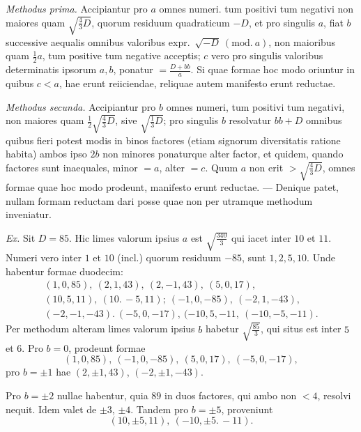 \emph{Methodus prima.} Accipiantur pro $a$ omnes numeri. tum positivi tum negativi non maiores quam $\surd{\frac43 D}$, quorum residuum quadraticum $-D$, et pro singulis $a$, fiat $b$ successive aequalis omnibus valoribus expr.\ $\surd{-D}\ (\mathrm{mod.}\ a)$, non maioribus quam $\frac12 a$, tum positive tum negative acceptis; $c$ vero pro singulis valoribus determinatis ipsorum $a,b$, ponatur $=\frac{D+bb}{a}$. Si quae formae hoc modo oriuntur in quibus $c<a$, hae erunt reiiciendae, reliquae autem manifesto erunt reductae.

\emph{Methodus secunda.} Accipiantur pro $b$ omnes numeri, tum positivi tum negativi, non maiores quam $\frac12\surd{\frac43 D}$, sive $\surd{\frac13 D}$; pro singulis $b$ resolvatur $bb+D$ omnibus quibus fieri potest modis in binos factores (etiam signorum diversitatis ratione habita) ambos ipso $2b$ non minores ponaturque alter factor, et quidem, quando factores sunt inaequales, minor $=a$, alter $=c$. Quum $a$ non erit $>\surd{\frac43 D}$, omnes formae quae hoc modo prodeunt, manifesto erunt reductae. --- Denique patet, nullam formam reductam dari posse quae non per utramque methodum inveniatur.

\emph{Ex.} Sit $D=85$. Hic limes valorum ipsius $a$ est $\surd{\frac{340}{3}}$ qui iacet inter $10$ et $11$. Numeri vero inter $1$ et $10$ (incl.) quorum residuum $-85$, sunt $1,2,5,10$. Unde habentur formae duodecim:
\[
\begin{gathered}
(1,0,85),\ (2,1,43),\ (2,-1,43),\ (5,0,17),\\
(10,5,11),\ (10.\,-5,11);\ (-1,0,-85),\ (-2,1,-43),\\
(-2,-1,-43).\ (-5,0,-17),\ (-10,5,-11,\ (-10,-5,-11).
\end{gathered}
\]
Per methodum alteram limes valorum ipsius $b$ habetur $\surd{\frac{85}{3}}$, qui situs est inter $5$ et $6$. Pro $b=0$, prodeunt formae
\[
(1,0,85),\ (-1,0,-85),\ (5,0,17),\ (-5,0,-17),
\]
pro $b=\pm1$ hae $(2,\pm1,43)$, $(-2,\pm1,-43)$.

Pro $b=\pm2$ nullae habentur, quia $89$ in duos factores, qui ambo non $<4$, resolvi nequit. Idem valet de $\pm3$, $\pm4$. Tandem pro $b=\pm5$, proveniunt
\[
(10,\pm5,11),\ (-10,\pm5.\,-11).
\]

